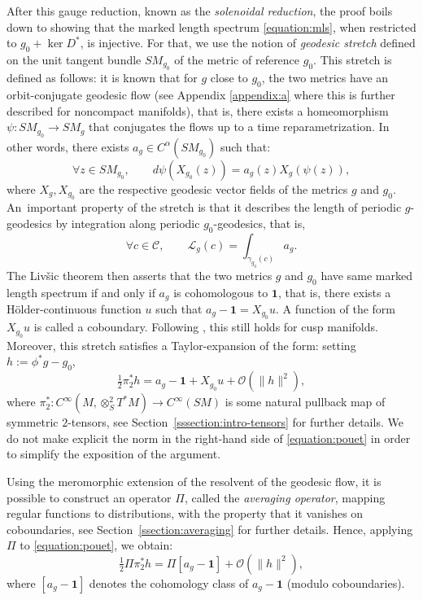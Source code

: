\documentclass[10pt]{amsart}
\newcommand{\mc}{\mathcal}
\theoremstyle{plain}
\theoremstyle{definition}
\begin{document}
After this gauge reduction, known as the \emph{solenoidal reduction}, the proof boils down to showing that the marked length spectrum \eqref{equation:mls}, when restricted to $g_0 + \ker D^*$, is injective. For that, we use the notion of \emph{geodesic stretch} defined on the unit tangent bundle $SM_{g_0}$ of the metric of reference $g_0$. This stretch is defined as follows: it is known that for $g$ close to $g_0$, the two metrics have an orbit-conjugate geodesic flow (see Appendix \ref{appendix:a} where this is further described for noncompact manifolds), that is, there exists a homeomorphism $\psi : SM_{g_0} \to SM_g$ that conjugates the flows up to a time reparametrization. In other words, there exists $a_g \in C^\alpha(SM_{g_0})$ such that:
\[
\forall z \in SM_{g_0}, \qquad d \psi(X_{g_0}(z)) = a_g(z) X_g(\psi(z)),
\]
where $X_g,X_{g_0}$ are the respective geodesic vector fields of the metrics $g$ and $g_0$. An~important property of the stretch is that it describes the length of periodic $g$-geodesics by integration along periodic $g_0$-geodesics, that is,
\[
\forall c \in \mc{C}, \qquad \mc{L}_g(c) = \int_{\gamma_{g_0}(c)} a_g.
\]
The Liv\v{s}ic theorem \cite{Livsic-72} then asserts that the two metrics $g$ and $g_0$ have same marked length spectrum if and only if $a_g$ is cohomologous to $\mathbf{1}$, that is, there exists a Hölder-continuous function $u$ such that $a_g - \mathbf{1}=X_{g_0}u$. A function of the form $X_{g_0}u$ is called a coboundary. Following \cite{Bonthonneau-Lefeuvre-19-1}, this still holds for cusp manifolds. Moreover, this stretch satisfies a Taylor-expansion of the form: setting $h := \phi^*g-g_0$,
\begin{equation}
\label{equation:pouet}
\tfrac{1}{2} \pi^*_2 h = a_g-\mathbf{1} + X_{g_0} u + \mc{O}(\|h\|^2),
\end{equation}
where $\pi_2^* : C^\infty(M,\otimes^2_S T^*M) \to C^\infty(SM)$ is some natural pullback map of symmetric $2$-tensors, see Section~\ref{sssection:intro-tensors} for further details.
We do not make explicit the norm in the right-hand side of \eqref{equation:pouet} in order to simplify the exposition of the argument.

Using the meromorphic extension of the resolvent of the geodesic flow, it is possible to construct an operator $\Pi$, called the \emph{averaging operator}, mapping regular functions to distributions, with the property that it vanishes on coboundaries, see Section~\ref{ssection:averaging} for further details. Hence, applying $\Pi$ to \eqref{equation:pouet}, we obtain:
\[
\tfrac{1}{2} \Pi \pi_2^* h = \Pi [a_g-\mathbf{1}] + \mc{O}(\|h\|^2),
\]
where $[a_g-\mathbf{1}]$ denotes the cohomology class of $a_g - \mathbf{1}$ (modulo coboundaries).
\end{document}
